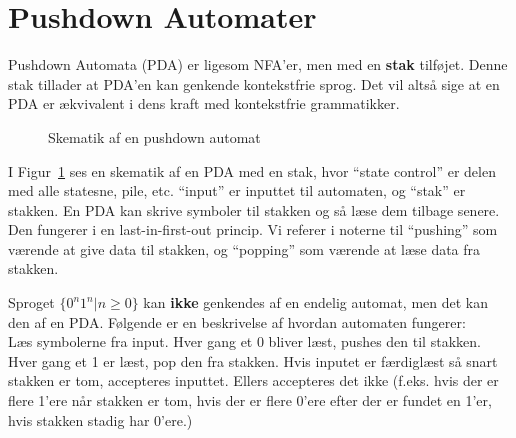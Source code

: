 \section{Pushdown Automater}%
\label{sec:pushdownautomata}

Pushdown Automata (PDA) er ligesom NFA'er, men med en \textbf{stak} tilføjet. Denne stak tillader at PDA'en kan genkende kontekstfrie sprog. Det vil altså sige at en PDA er ækvivalent i dens kraft med kontekstfrie grammatikker.

\begin{figure}[ht]
	\centering
	\caption{\label{fig:pda} Skematik af en pushdown automat}
\end{figure}

I Figur~\ref{fig:pda} ses en skematik af en PDA med en stak, hvor ``state control'' er delen med alle statesne, pile, etc. ``input'' er inputtet til automaten, og ``stak'' er stakken. En PDA kan skrive symboler til stakken og så læse dem tilbage senere. Den fungerer i en last-in-first-out princip. Vi referer i noterne til ``pushing'' som værende at give data til stakken, og ``popping'' som værende at læse data fra stakken.

\begin{example}
	Sproget $\{0^{n}1^{n} | n \ge 0\}$ kan \textbf{ikke} genkendes af en endelig automat, men det kan den af en PDA. Følgende er en beskrivelse af hvordan automaten fungerer:\\
	\noindent
	Læs symbolerne fra input. Hver gang et 0 bliver læst, pushes den til stakken. Hver gang et 1 er læst, pop den fra stakken. Hvis inputet er færdiglæst så snart stakken er tom, accepteres inputtet. Ellers accepteres det ikke (f.eks. hvis der er flere 1'ere når stakken er tom, hvis der er flere 0'ere efter der er fundet en 1'er, hvis stakken stadig har 0'ere.)
\end{example}

